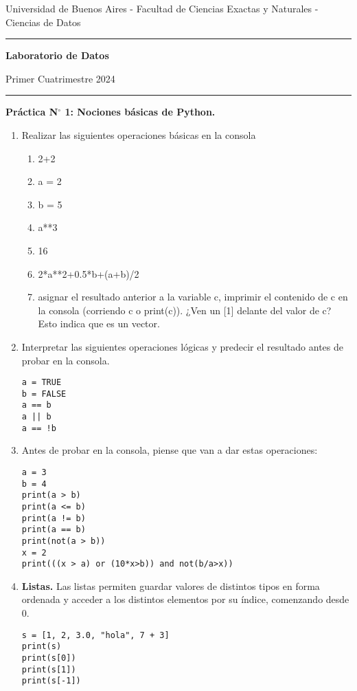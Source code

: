 \documentclass[a4paper,11pt]{article}
\theoremstyle{definition}
\begin{document}
\centerline{{\small Universidad de Buenos Aires - Facultad de Ciencias Exactas y Naturales - Ciencias de Datos}}

\vskip 0.2cm

\hrule

\vskip 0.2cm

 \centerline{{\bf\Large{\sc Laboratorio de Datos}}}

 \vskip 0.2cm

 \centerline{\ttfamily Primer Cuatrimestre 2024}

\vskip 0.2cm

 \hrule

 \bigskip
 \centerline{\bf Práctica N$^\circ$ 1: Nociones básicas de Python.}
 \bigskip

\begin{enumerate}
\item
Realizar las siguientes operaciones básicas en la consola
\begin{enumerate}
\item 2+2
\item a = 2
\item b = 5
\item a**3
\item 16 %
\item 2*a**2+0.5*b+(a+b)/2
\item asignar el resultado anterior a la variable c, imprimir el contenido de c en la consola (corriendo c o print(c)). ¿Ven un [1] delante del valor de c? Esto indica que es un vector.
\end{enumerate}

\item Interpretar las siguientes operaciones lógicas y predecir el resultado antes de probar en la consola.
\begin{lstlisting}
a = TRUE
b = FALSE
a == b
a || b
a == !b
\end{lstlisting}

\item Antes de probar en la consola, piense que van a dar estas operaciones:
\begin{lstlisting}
a = 3
b = 4
print(a > b)
print(a <= b)
print(a != b)
print(a == b)
print(not(a > b))
x = 2
print(((x > a) or (10*x>b)) and not(b/a>x))
\end{lstlisting}

\item \textbf{Listas.}
Las listas permiten guardar valores de distintos tipos en forma ordenada y acceder a los distintos elementos por su índice, comenzando desde 0.
\begin{lstlisting}
s = [1, 2, 3.0, "hola", 7 + 3]
print(s)
print(s[0])
print(s[1])
print(s[-1])
\end{lstlisting}



\end{enumerate}
\end{document}
